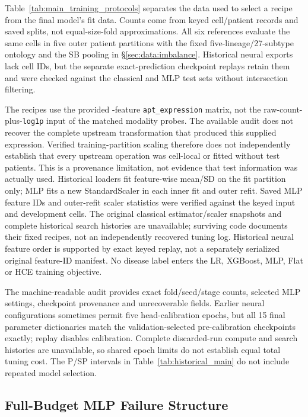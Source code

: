 Table~\ref{tab:main_training_protocols} separates the data used to select a
recipe from the final model's fit data. Counts come from keyed cell/patient
records and saved splits, not equal-size-fold approximations. All six
references evaluate the same \numcells{} cells in five outer patient partitions
with the fixed five-lineage/27-subtype ontology and the SB pooling in
\S\ref{sec:data:imbalance}. Historical neural exports lack cell IDs, but the
separate exact-prediction checkpoint replays retain them and were checked
against the classical and MLP test sets without intersection filtering.



The recipes use the provided \numaptfeatures{}-feature \texttt{apt\_expression} matrix,
not the raw-count-plus-\texttt{log1p} input of the matched modality probes.
The available audit does not recover the complete upstream transformation
that produced this supplied expression. Verified training-partition scaling
therefore does not independently establish that every upstream operation
was cell-local or fitted without test patients. This is a provenance limitation,
not evidence that test information was actually used.
Historical loaders fit feature-wise mean/SD on the fit partition only;
MLP fits a new StandardScaler in each inner fit and outer refit. Saved MLP
feature IDs and outer-refit scaler statistics were verified against the
keyed input and development cells. The original classical estimator/scaler
snapshots and complete historical search histories are unavailable; surviving
code documents their fixed recipes, not an independently recovered tuning
log. Historical neural feature order is supported by exact keyed replay,
not a separately serialized original feature-ID manifest. No disease label
enters the LR, XGBoost, MLP, Flat or HCE training objective.

The machine-readable audit provides exact fold/seed/stage counts, selected
MLP settings, checkpoint provenance and unrecoverable fields. Earlier neural
configurations sometimes permit five head-calibration epochs, but all 15
final parameter dictionaries match the validation-selected pre-calibration
checkpoints exactly; replay disables calibration. Complete discarded-run
compute and search histories are unavailable, so shared epoch limits do not
establish equal total tuning cost. The P/SP intervals in Table~\ref{tab:historical_main}
do not include repeated model selection.

\clearpage
\subsection{Full-Budget MLP Failure Structure}
\label{sec:appendix:mlp_failures}

